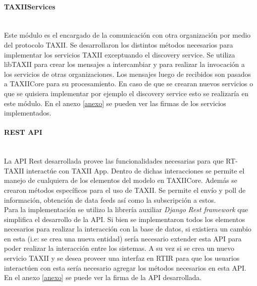 \paragraph{TAXIIServices}\ \\
Este módulo es el encargado de la comunicación con otra organización por medio del protocolo TAXII. Se desarrollaron  los distintos métodos necesarios para implementar los servicios TAXII exceptuando el discovery service.
Se utiliza libTAXII para crear los mensajes a intercambiar y para realizar la invocación a los servicios de otras organizaciones.
Los mensajes luego de recibidos son pasados a TAXIICore para su procesamiento.
En caso de que se crearan nuevos servicios o que se quisiera implementar por ejemplo el discovery service esto se realizaría en este módulo.
En el anexo \ref{anexo} se pueden ver las firmas de los servicios implementados.

\paragraph{REST API}\ \\
La API Rest desarrollada provee las funcionalidades necesarias para que RT-TAXII interactúe con TAXII App. Dentro de dichas interacciones se permite el manejo de cualquiera de los elementos del modelo en TAXIICore. Además se crearon métodos específicos para el uso de TAXII. Se permite el envío y poll de información, obtención de data feeds así como la subscripción a estos.\\

Para la implementación se utilizo la librería auxiliar \textit{Django Rest framework} que simplifica el desarrollo de la API.
Si bien se implementaron todos los elementos necesarios para realizar la interacción con la base de datos, si existiera un cambio en esta (i.e: se crea una nueva entidad) sería necesario extender esta API para poder realizar la interacción entre los sistemas. A su vez si se crea un nuevo servicio TAXII y se desea proveer una interfaz en RTIR para que los usuarios interactúen con esta sería necesario agregar los métodos necesarios en esta API.
En el anexo \ref{anexo} se puede ver la firma de la API desarrollada.
